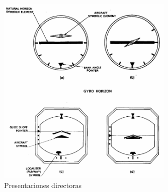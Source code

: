   \begin{figure}[!htb]
    \centering
        \includegraphics[width=0.75\textwidth]{01.tablero.instrumentos/U01.imagenes/1.2.clasificacion.instrumentos/director.png}
    \caption{Presentaciones directoras \protect\cite{pallett1992aircraft}}
    \label{fig:01.presentaciones.directoras}
  \end{figure}






